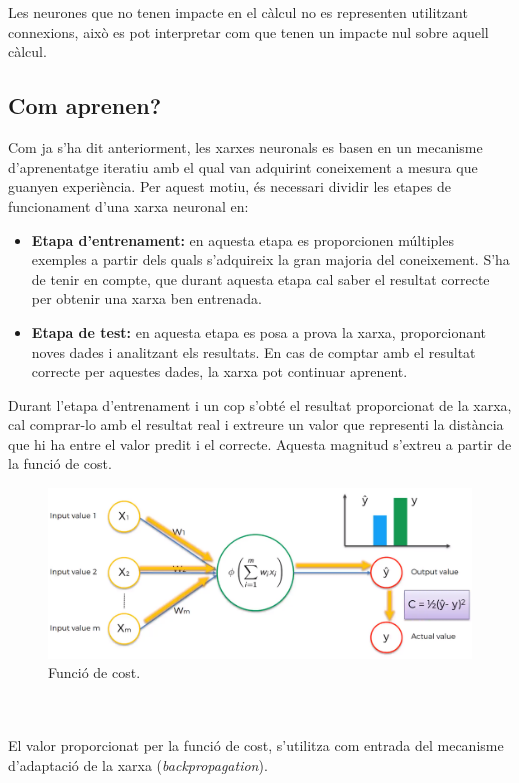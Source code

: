 \documentclass[12pt]{article}
\begin{document}
\\\\Les neurones que no tenen impacte en el càlcul no es representen utilitzant connexions, això es pot interpretar com que tenen un impacte nul sobre aquell càlcul.

\clearpage
\subsection{Com aprenen?}
Com ja s'ha dit anteriorment, les xarxes neuronals es basen en un mecanisme d'aprenentatge iteratiu amb el qual van adquirint coneixement a mesura que guanyen experiència. Per aquest motiu, és necessari dividir les etapes de funcionament d'una xarxa neuronal en:
\begin{itemize}
	\item \textbf{Etapa d'entrenament:} en aquesta etapa es proporcionen múltiples exemples a partir dels quals s'adquireix la gran majoria del coneixement. S'ha de tenir en compte, que durant aquesta etapa cal saber el resultat correcte per obtenir una xarxa ben entrenada.
	\item \textbf{Etapa de test:} en aquesta etapa es posa a prova la xarxa, proporcionant noves dades i analitzant els resultats. En cas de comptar amb el resultat correcte per aquestes dades, la xarxa pot continuar aprenent.
\end{itemize}
Durant l'etapa d'entrenament i un cop s'obté el resultat proporcionat de la xarxa, cal comprar-lo amb el resultat real i extreure un valor que representi la distància que hi ha entre el valor predit i el correcte. Aquesta magnitud s'extreu a partir de la funció de cost. 
\begin{figure}[h!]
	\centering
	\includegraphics[scale=0.3]{imatges/aprendre/1aprendre.png}
	\caption{Funció de cost.}
\end{figure}
\\\\El valor proporcionat per la funció de cost, s'utilitza com entrada del mecanisme d'adaptació de la xarxa (\textit{backpropagation}).
\end{document}
